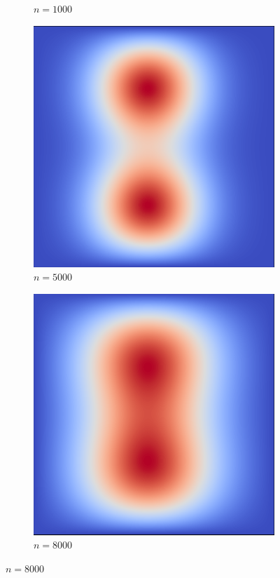 \documentclass[12pt, letterpaper]{article}
\begin{document}
\begin{figure}[h]
\begin{subfigure}[b]{.21\linewidth}
    \caption{$n=1000$}
  \end{subfigure}
  \begin{subfigure}[b]{.21\linewidth}
    \includegraphics[width=\linewidth]{HeatProgression/diffusion5000}
    \caption{$n=5000$}
  \end{subfigure}
  \begin{subfigure}[b]{.21\linewidth}
    \includegraphics[width=\linewidth]{HeatProgression/diffusion8000}
    \caption{$n=8000$}
  \end{subfigure}
\end{figure}
\end{document}
